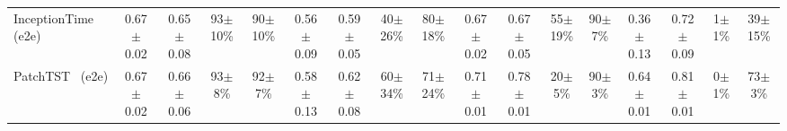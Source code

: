 \begin{table}[t]
\begin{tabular*}{\textwidth}{@{\extracolsep{\fill}}lcccccccccccccccc@{}}
    InceptionTime~\cite{ismail2020inceptiontime} (e2e) & 0.67{\tiny$\pm$0.02} & 0.65{\tiny$\pm$0.08} & 93{\tiny$\pm$10}\% & 90{\tiny$\pm$10}\% & 0.56{\tiny$\pm$0.09} & 0.59{\tiny$\pm$0.05} & 40{\tiny$\pm$26}\% & 80{\tiny$\pm$18}\% & 0.67{\tiny$\pm$0.02} & 0.67{\tiny$\pm$0.05} & 55{\tiny$\pm$19}\% & 90{\tiny$\pm$7}\% & 0.36{\tiny$\pm$0.13} & 0.72{\tiny$\pm$0.09} & 1{\tiny$\pm$1}\% & 39{\tiny$\pm$15}\% \\
    PatchTST~\cite{nie2023patchtst} (e2e) & 0.67{\tiny$\pm$0.02} & 0.66{\tiny$\pm$0.06} & 93{\tiny$\pm$8}\% & 92{\tiny$\pm$7}\% & 0.58{\tiny$\pm$0.13} & 0.62{\tiny$\pm$0.08} & 60{\tiny$\pm$34}\% & 71{\tiny$\pm$24}\% & 0.71{\tiny$\pm$0.01} & 0.78{\tiny$\pm$0.01} & 20{\tiny$\pm$5}\% & 90{\tiny$\pm$3}\% & 0.64{\tiny$\pm$0.01} & 0.81{\tiny$\pm$0.01} & 0{\tiny$\pm$1}\% & 73{\tiny$\pm$3}\% \\
    \bottomrule
  \end{tabular*}
\end{table}
